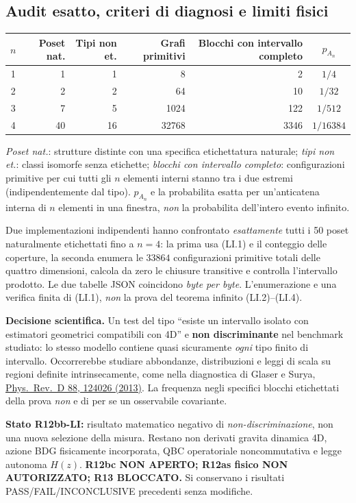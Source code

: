 \documentclass[11pt,a4paper]{article}
\begin{document}
\clearpage
\subsection*{Audit esatto, criteri di diagnosi e limiti fisici}
\begin{center}\small
\begin{tabular}{c|r|r|r|r|c}
$n$ & Poset nat. & Tipi non et. & Grafi primitivi & Blocchi con intervallo completo & $p_{A_n}$\\\hline
1 & 1 & 1 & 8 & 2 & $1/4$\\
2 & 2 & 2 & 64 & 10 & $1/32$\\
3 & 7 & 5 & 1024 & 122 & $1/512$\\
4 & 40 & 16 & 32768 & 3346 & $1/16384$
\end{tabular}
\end{center}
\emph{Poset nat.}: strutture distinte con una specifica etichettatura naturale; \emph{tipi non et.}: classi isomorfe senza etichette; \emph{blocchi con intervallo completo}: configurazioni primitive per cui tutti gli $n$ elementi interni stanno tra i due estremi (indipendentemente dal tipo). $p_{A_n}$ e la probabilita esatta per un'anticatena interna di $n$ elementi in una finestra, \emph{non} la probabilita dell'intero evento infinito.

Due implementazioni indipendenti hanno confrontato \emph{esattamente} tutti i 50 poset naturalmente etichettati fino a $n=4$: la prima usa (LI.1) e il conteggio delle coperture, la seconda enumera le $33864$ configurazioni primitive totali delle quattro dimensioni, calcola da zero le chiusure transitive e controlla l'intervallo prodotto. Le due tabelle JSON coincidono \emph{byte per byte}. L'enumerazione e una verifica finita di (LI.1), \emph{non} la prova del teorema infinito (LI.2)--(LI.4).

\textbf{Decisione scientifica.} Un test del tipo ``esiste un intervallo isolato con estimatori geometrici compatibili con 4D'' e \textbf{non discriminante} nel benchmark studiato: lo stesso modello contiene quasi sicuramente \emph{ogni} tipo finito di intervallo. Occorrerebbe studiare abbondanze, distribuzioni e leggi di scala su regioni definite intrinsecamente, come nella diagnostica di Glaser e Surya, \href{https://doi.org/10.1103/PhysRevD.88.124026}{Phys.~Rev.~D 88, 124026 (2013)}. La frequenza negli specifici blocchi etichettati della prova \emph{non} e di per se un osservabile covariante.

\textbf{Stato R12bb-LI:} risultato matematico negativo di \emph{non-discriminazione}, non una nuova selezione della misura. Restano non derivati gravita dinamica 4D, azione BDG fisicamente incorporata, QBC operatoriale noncommutativa e legge autonoma $H(z)$. \textbf{R12bc NON APERTO; R12as fisico NON AUTORIZZATO; R13 BLOCCATO.} Si conservano i risultati PASS/FAIL/INCONCLUSIVE precedenti senza modifiche.
\end{document}
